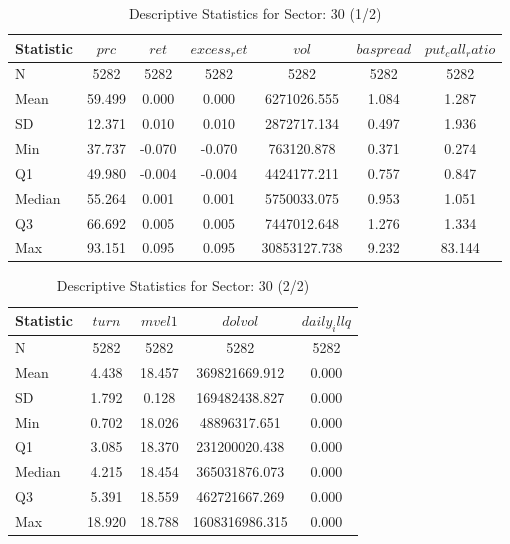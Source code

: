     \begin{table}[H]
    \centering

    
    \caption{Descriptive Statistics for Sector: 30 (1/2)}
    \label{tab:sec30_a}
    
    \begin{tabular}{lcccccc}
    \toprule
    Statistic & $prc$ & $ret$ & $excess_ret$ & $vol$ & $baspread$ & $put_call_ratio$ \\\midrule
    N & 5282 & 5282 & 5282 & 5282 & 5282 & 5282 \\
    Mean & 59.499 & 0.000 & 0.000 & 6271026.555 & 1.084 & 1.287 \\
    SD & 12.371 & 0.010 & 0.010 & 2872717.134 & 0.497 & 1.936 \\
    Min & 37.737 & -0.070 & -0.070 & 763120.878 & 0.371 & 0.274 \\
    Q1 & 49.980 & -0.004 & -0.004 & 4424177.211 & 0.757 & 0.847 \\
    Median & 55.264 & 0.001 & 0.001 & 5750033.075 & 0.953 & 1.051 \\
    Q3 & 66.692 & 0.005 & 0.005 & 7447012.648 & 1.276 & 1.334 \\
    Max & 93.151 & 0.095 & 0.095 & 30853127.738 & 9.232 & 83.144 \\
    \bottomrule
    \end{tabular}

    \end{table}
    
    \begin{table}[H]
    \centering

    
    \caption{Descriptive Statistics for Sector: 30 (2/2)}
    \label{tab:sec30_b}
    
    \begin{tabular}{lcccc}
    \toprule
    Statistic & $turn$ & $mvel1$ & $dolvol$ & $daily_illq$ \\\midrule
    N & 5282 & 5282 & 5282 & 5282 \\
    Mean & 4.438 & 18.457 & 369821669.912 & 0.000 \\
    SD & 1.792 & 0.128 & 169482438.827 & 0.000 \\
    Min & 0.702 & 18.026 & 48896317.651 & 0.000 \\
    Q1 & 3.085 & 18.370 & 231200020.438 & 0.000 \\
    Median & 4.215 & 18.454 & 365031876.073 & 0.000 \\
    Q3 & 5.391 & 18.559 & 462721667.269 & 0.000 \\
    Max & 18.920 & 18.788 & 1608316986.315 & 0.000 \\
    \bottomrule
    \end{tabular}

    \end{table}
    
